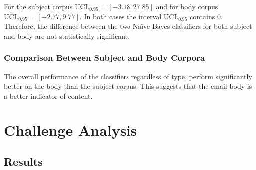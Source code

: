 \documentclass[10pt, a4paper]{article}
\begin{document}
For the subject corpus $\text{UCL}_{0.95} = [-3.18, 27.85]$ and for body corpus $\text{UCL}_{0.95} = [-2.77, 9.77]$. In both cases the interval $\text{UCL}_{0.95}$ contains 0. Therefore, the difference between the two Na\"ive Bayes classifiers for both subject and body are not statistically significant.

\subsubsection{Comparison Between Subject and Body Corpora}

The overall performance of the classifiers regardless of type, perform significantly better on the body than the subject corpus. This suggests that the email body is a better indicator of content.

\section{Challenge Analysis}



\subsection{Results}
\end{document}
